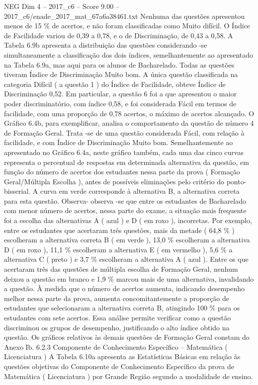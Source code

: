 \begin{textsample}{NEG Dim 4 – 2017\_c6 – Score 9.00 – 2017\_c6/enade\_2017\_mat\_67a6a38461.txt}
Nenhuma das questões apresentou menos de 15 \% de acertos, e não foram classificadas como Muito difícil.
O Índice de Facilidade variou de 0,39 a 0,78, e o de Discriminação, de 0,43 a 0,58.
A Tabela 6.9b apresenta a distribuição das questões considerando -se simultaneamente a classificação dos dois índices, semelhantemente ao apresentado na Tabela 6.9a, mas aqui para os alunos de Bacharelado.
Todas as questões tiveram Índice de Discriminação Muito bom.
A única questão classificada na categoria Difícil ( a questão 1 ) do Índice de Facilidade, obteve Índice de Discriminação 0,52.
Em particular, a questão 6 foi a que apresentou o maior poder discriminatório, com índice 0,58, e foi considerada Fácil em termos de facilidade, com uma proporção de 0,78 acertos, o máximo de acertos alcançado.
O Gráfico 6.4b, para exemplificar, analisa o comportamento da questão de número 4 de Formação Geral.
Trata -se de uma questão considerada Fácil, com relação à facilidade, e com Índice de Discriminação Muito bom.
Semelhantemente ao apresentado no Gráfico 6.4a, neste gráfico também, cada uma das cinco curvas representa o percentual de respostas em determinada alternativa da questão, em função do número de acertos dos estudantes nessa parte da prova ( Formação Geral/Múltipla Escolha ), antes de possíveis eliminações pelo critério do ponto-bisserial.
A curva em verde corresponde à alternativa B, a alternativa correta para esta questão.
Observa- observa -se que entre os estudantes de Bacharelado com menor número de acertos, nessa parte do exame, a situação mais frequente foi a escolha das alternativas A ( azul ) e D ( em roxo ), incorretas.
Por exemplo, entre os estudantes que acertaram três questões, mais da metade ( 64,8 \% ) escolheram a alternativa correta B ( em verde ), 13,0 \% escolheram a alternativa D ( em roxo ), 11,1 \% escolheram a alternativa E ( em vermelho ), 5,6 \% a alternativa C ( preto ) e 3,7 \% escolheram a alternativa A ( azul ).
Entre os que acertaram três das questões de múltipla escolha de Formação Geral, nenhum deixou a questão em branco e 1,9 \% marcou mais de uma alternativa, invalidando a questão.
À medida que o número de acertos aumenta, indicando desempenho melhor nessa parte da prova, aumenta concomitantemente a proporção de estudantes que selecionaram a alternativa correta B, atingindo 100 \% para os estudantes com sete acertos.
Essa análise permite verificar como a questão discriminou os grupos de desempenho, justificando o alto índice obtido na questão.
Os gráficos relativos às demais questões de Formação Geral constam do Anexo Ib. 6.2.3 Componente de Conhecimento Específico – Matemática ( Licenciatura ) A Tabela 6.10a apresenta as Estatísticas Básicas em relação às questões objetivas do Componente de Conhecimento Específico da prova de Matemática ( Licenciatura ) por Grande Região segundo a modalidade de ensino.

\end{textsample}
